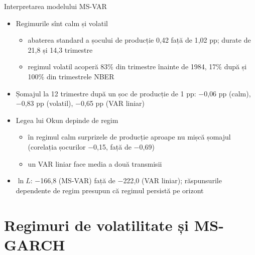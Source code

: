 \begin{frame}{Interpretarea modelului MS-VAR}
\itemsize{\small}
\begin{itemize}
    \item Regimurile sînt calm și volatil
    \begin{itemize}
        \item abaterea standard a șocului de producție 0{,}42 față de 1{,}02 pp; durate de 21{,}8 și 14{,}3 trimestre
        \item regimul volatil acoperă 83\% din trimestre înainte de 1984, 17\% după și 100\% din trimestrele NBER
    \end{itemize}
    \item Șomajul la 12 trimestre după un șoc de producție de 1 pp: \ensuremath{-}0{,}06 pp (calm), \ensuremath{-}0{,}83 pp (volatil), \ensuremath{-}0{,}65 pp (VAR liniar)
    \item Legea lui Okun depinde de regim
    \begin{itemize}
        \item în regimul calm surprizele de producție aproape nu mișcă șomajul (corelația șocurilor \ensuremath{-}0{,}15, față de \ensuremath{-}0{,}69)
        \item un VAR liniar face media a două transmisii
    \end{itemize}
    \item $\ln L$: \ensuremath{-}166{,}8 (MS-VAR) față de \ensuremath{-}222{,}0 (VAR liniar); răspunsurile dependente de regim presupun că regimul persistă pe orizont
\end{itemize}
\end{frame}


\section{Regimuri de volatilitate și MS-GARCH}

